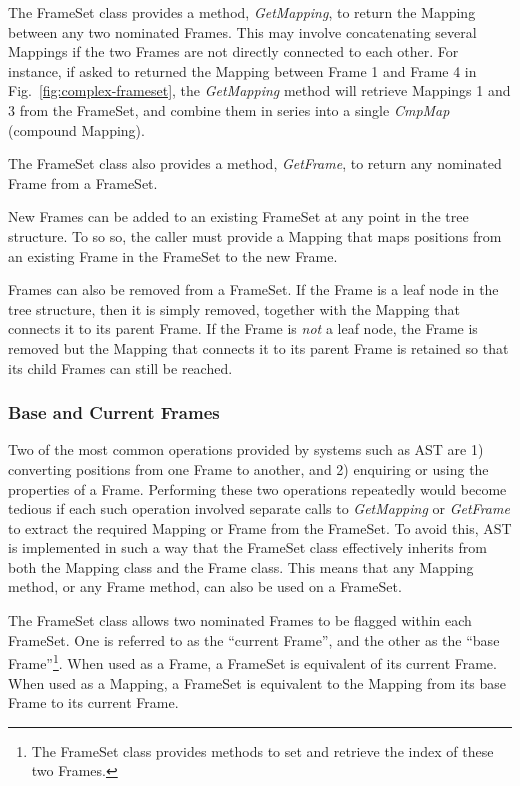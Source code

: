 \documentclass[final,authoryear,5p,times,twocolumn]{elsarticle}
\begin{document}
The FrameSet class provides a method, \emph{GetMapping}, to return the
Mapping between any two nominated Frames. This may involve concatenating
several Mappings if the two Frames are not directly connected to each
other. For instance, if asked to returned the Mapping between Frame 1 and
Frame 4 in Fig.~\ref{fig:complex-frameset}, the \emph{GetMapping} method
will retrieve Mappings 1 and 3 from the FrameSet, and combine them in
series into a single \emph{CmpMap} (compound Mapping).

The FrameSet class also provides a method, \emph{GetFrame}, to
return any nominated Frame from a FrameSet.

New Frames can be added to an existing FrameSet at any point in the tree
structure. To so so, the caller must provide a Mapping that maps positions
from an existing Frame in the FrameSet to the new Frame.

Frames can also be removed from a FrameSet. If the Frame is a leaf node
in the tree structure, then it is simply removed, together with the
Mapping that  connects it to its parent Frame. If the Frame is \emph{not}
a leaf node, the Frame is removed but the Mapping that connects it to its
parent Frame is retained so that its child Frames can still be reached.

\subsubsection{Base and Current Frames}
Two of the most common operations provided by systems such as AST are 1)
converting positions from one Frame to another, and 2) enquiring or using
the properties of a Frame. Performing these two operations repeatedly
would become tedious if each such operation involved separate calls to
\emph{GetMapping} or \emph{GetFrame} to extract the required Mapping or
Frame from the FrameSet. To avoid this, AST is implemented in such a way
that the FrameSet class effectively inherits from both the Mapping class
and the Frame class. This means that any Mapping method, or any Frame
method, can also be used on a FrameSet.

The FrameSet class allows two nominated Frames to be flagged within each
FrameSet. One is referred to as the ``current Frame'', and the other as
the ``base Frame''\footnote{The FrameSet class provides methods to set
and retrieve the index of these two Frames.}. When used as a Frame, a
FrameSet is equivalent of its current Frame. When used as a Mapping, a
FrameSet is equivalent to the Mapping from its base Frame to its current
Frame.
\end{document}
